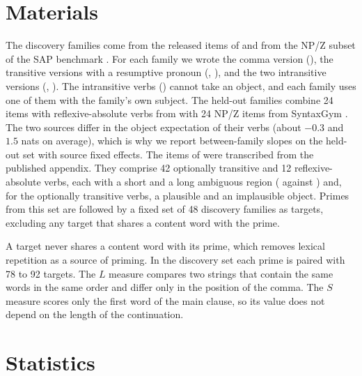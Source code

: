 \section{Materials}
\label{app:materials}

The discovery families come from the released items of \citet{amouyal2025} and from the NP/Z subset of the SAP benchmark \citep{huang2024}.
For each family we wrote the comma version (), the transitive versions with a resumptive pronoun (, ), and the two intransitive versions (, ).
The intransitive verbs () cannot take an object, and each family uses one of them with the family's own subject.
The held-out families combine 24 items with reflexive-absolute verbs from \citet{cehakova2025} with 24 NP/Z items from SyntaxGym \citep{gauthier2020}.
The two sources differ in the object expectation of their verbs (about $-0.3$ and $1.5$ nats on average), which is why we report between-family slopes on the held-out set with source fixed effects.
The items of \citet{christianson2001} were transcribed from the published appendix.
They comprise 42 optionally transitive and 12 reflexive-absolute verbs, each with a short and a long ambiguous region ( against ) and, for the optionally transitive verbs, a plausible and an implausible object.
Primes from this set are followed by a fixed set of 48 discovery families as targets, excluding any target that shares a content word with the prime.

A target never shares a content word with its prime, which removes lexical repetition as a source of priming.
In the discovery set each prime is paired with 78 to 92 targets.
The $L$ measure compares two strings that contain the same words in the same order and differ only in the position of the comma.
The $S$ measure scores only the first word of the main clause, so its value does not depend on the length of the continuation.

\section{Statistics}
\label{app:stats}

